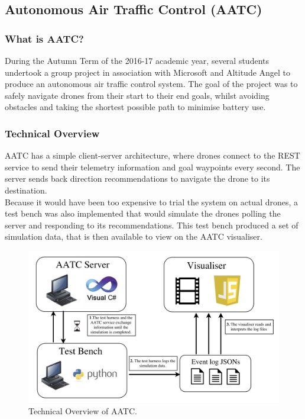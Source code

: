\documentclass[a4paper,12pt,titlepage]{article}
\begin{document}
\subsection{Autonomous Air Traffic Control (AATC)}
\subsubsection{What is AATC?}
During the Autumn Term of the 2016-17 academic year, several students undertook a group project in association with Microsoft and Altitude Angel to produce an autonomous air traffic control system. The goal of the project was to safely navigate drones from their start to their end goals, whilst avoiding obstacles and taking the shortest possible path to minimise battery use.

\subsubsection{Technical Overview}
AATC has a simple client-server architecture, where drones connect to the REST service to send their telemetry information and goal waypoints every second. The server sends back direction recommendations to navigate the drone to its destination. \\

Because it would have been too expensive to trial the system on actual drones, a test bench was also implemented that would simulate the drones polling the server and responding to its recommendations. This test bench produced a set of simulation data, that is then available to view on the AATC visualiser\cite{Balaji2017a}.

\begin{figure}[!hbpt]
  \center
  \includegraphics[width=0.8\linewidth]{img/aatc_tech_overview.jpg}
  \caption{Technical Overview of AATC. \cite{Balaji2017}}
  \label{fig:aatc_tech_overview}
\end{figure}
\end{document}

